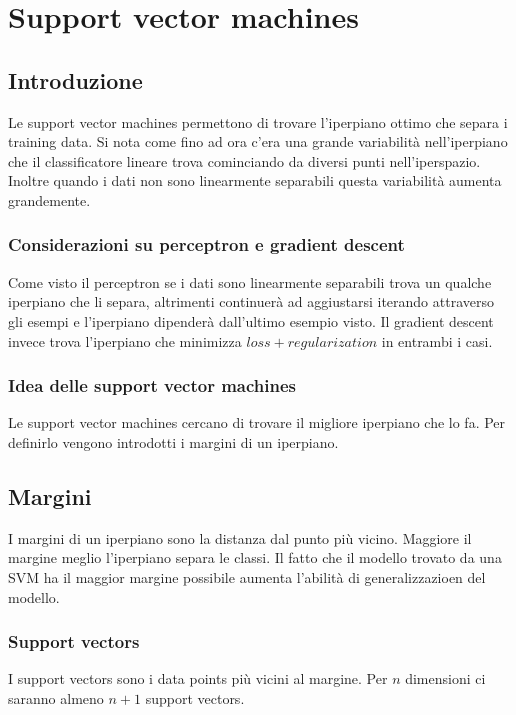 \chapter{Support vector machines}

\section{Introduzione}
Le support vector machines permettono di trovare l'iperpiano ottimo che separa i training data.
Si nota come fino ad ora c'era una grande variabilit\`a nell'iperpiano che il classificatore lineare trova cominciando da diversi punti nell'iperspazio.
Inoltre quando i dati non sono linearmente separabili questa variabilit\`a aumenta grandemente.

	\subsection{Considerazioni su perceptron e gradient descent}
	Come visto il perceptron se i dati sono linearmente separabili trova un qualche iperpiano che li separa, altrimenti continuer\`a ad aggiustarsi iterando attraverso gli esempi e l'iperpiano dipender\`a dall'ultimo esempio visto.
	Il gradient descent invece trova l'iperpiano che minimizza $loss+regularization$ in entrambi i casi.

	\subsection{Idea delle support vector machines}
	Le support vector machines cercano di trovare il migliore iperpiano che lo fa.
	Per definirlo vengono introdotti i margini di un iperpiano.

\section{Margini}
I margini di un iperpiano sono la distanza dal punto pi\`u vicino.
Maggiore il margine meglio l'iperpiano separa le classi.
Il fatto che il modello trovato da una SVM ha il maggior margine possibile aumenta l'abilit\`a di generalizzazioen del modello.

	\subsection{Support vectors}
	I support vectors sono i data points pi\`u vicini al margine.
	Per $n$ dimensioni ci saranno almeno $n+1$ support vectors.

